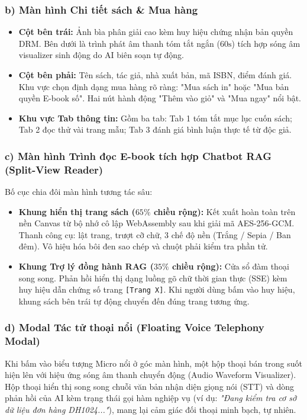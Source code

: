 \documentclass[11pt, a4paper]{report}
\begin{document}
\subsubsection{b) Màn hình Chi tiết sách \& Mua hàng}
\begin{itemize}
    \item \textbf{Cột bên trái:} Ảnh bìa phân giải cao kèm huy hiệu chứng nhận bản quyền DRM. Bên dưới là trình phát âm thanh tóm tắt ngắn ($60\text{s}$) tích hợp sóng âm visualizer sinh động do AI biên soạn tự động.
    \item \textbf{Cột bên phải:} Tên sách, tác giả, nhà xuất bản, mã ISBN, điểm đánh giá. Khu vực chọn định dạng mua hàng rõ ràng: "Mua sách in" hoặc "Mua bản quyền E-book số". Hai nút hành động "Thêm vào giỏ" và "Mua ngay" nổi bật.
    \item \textbf{Khu vực Tab thông tin:} Gồm ba tab: Tab 1 tóm tắt mục lục cuốn sách; Tab 2 đọc thử vài trang mẫu; Tab 3 đánh giá bình luận thực tế từ độc giả.
\end{itemize}

\subsubsection{c) Màn hình Trình đọc E-book tích hợp Chatbot RAG (Split-View Reader)}
Bố cục chia đôi màn hình tương tác sâu:
\begin{itemize}
    \item \textbf{Khung hiển thị trang sách ($65\%$ chiều rộng):} Kết xuất hoàn toàn trên nền Canvas từ bộ nhớ cô lập WebAssembly sau khi giải mã AES-256-GCM. Thanh công cụ: lật trang, trượt cỡ chữ, 3 chế độ nền (Trắng / Sepia / Ban đêm). Vô hiệu hóa bôi đen sao chép và chuột phải kiểm tra phần tử.
    \item \textbf{Khung Trợ lý đồng hành RAG ($35\%$ chiều rộng):} Cửa sổ đàm thoại song song. Phản hồi hiển thị dạng luồng gõ chữ thời gian thực (SSE) kèm huy hiệu dẫn chứng số trang \texttt{[Trang X]}. Khi người dùng bấm vào huy hiệu, khung sách bên trái tự động chuyển đến đúng trang tương ứng.
\end{itemize}

\subsubsection{d) Modal Tác tử thoại nổi (Floating Voice Telephony Modal)}
Khi bấm vào biểu tượng Micro nổi ở góc màn hình, một hộp thoại bán trong suốt hiện lên với hiệu ứng sóng âm thanh chuyển động (Audio Waveform Visualizer). Hộp thoại hiển thị song song chuỗi văn bản nhận diện giọng nói (STT) và dòng phản hồi của AI kèm trạng thái gọi hàm nghiệp vụ (ví dụ: \textit{"Đang kiểm tra cơ sở dữ liệu đơn hàng DH1024..."}), mang lại cảm giác đối thoại minh bạch, tự nhiên.
\end{document}
